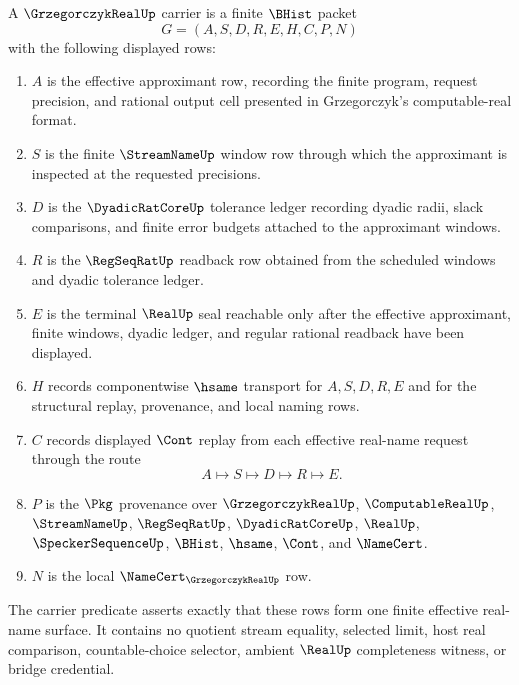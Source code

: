 \begin{definition}
\label{def:grzegorczyk-real-carrier}
A $\GrzegorczykRealUp$ carrier is a finite $\BHist$ packet
$$
G=(A,S,D,R,E,H,C,P,N)
$$
with the following displayed rows:
\begin{enumerate}
\item $A$ is the effective approximant row, recording the finite program, request precision, and rational output cell presented in Grzegorczyk's computable-real format.
\item $S$ is the finite $\StreamNameUp$ window row through which the approximant is inspected at the requested precisions.
\item $D$ is the $\DyadicRatCoreUp$ tolerance ledger recording dyadic radii, slack comparisons, and finite error budgets attached to the approximant windows.
\item $R$ is the $\RegSeqRatUp$ readback row obtained from the scheduled windows and dyadic tolerance ledger.
\item $E$ is the terminal $\RealUp$ seal reachable only after the effective approximant, finite windows, dyadic ledger, and regular rational readback have been displayed.
\item $H$ records componentwise $\hsame$ transport for $A,S,D,R,E$ and for the structural replay, provenance, and local naming rows.
\item $C$ records displayed $\Cont$ replay from each effective real-name request through the route
$$
A\longmapsto S\longmapsto D\longmapsto R\longmapsto E .
$$
\item $P$ is the $\Pkg$ provenance over $\GrzegorczykRealUp$, $\ComputableRealUp$, $\StreamNameUp$, $\RegSeqRatUp$, $\DyadicRatCoreUp$, $\RealUp$, $\SpeckerSequenceUp$, $\BHist$, $\hsame$, $\Cont$, and $\NameCert$.
\item $N$ is the local $\NameCert_{\GrzegorczykRealUp}$ row.
\end{enumerate}
The carrier predicate asserts exactly that these rows form one finite effective real-name surface. It contains no quotient stream equality, selected limit, host real comparison, countable-choice selector, ambient $\RealUp$ completeness witness, or bridge credential.
\end{definition}

